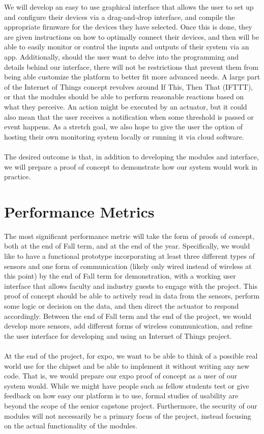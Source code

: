 \documentclass[onecolumn, draftclsnofoot,10pt, compsoc]{IEEEtran}
\begin{document}
    We will develop an easy to use graphical interface that allows the user to set up and configure their devices via a drag-and-drop interface, and compile the appropriate firmware for the devices they have selected. Once this is done, they are given instructions on how to optimally connect their devices, and then will be able to easily monitor or control the inputs and outputs of their system via an app. Additionally, should the user want to delve into the programming and details behind our interface, there will not be restrictions that prevent them from being able customize the platform to better fit more advanced needs. A large part of the Internet of Things concept revolves around If This, Then That (IFTTT), or that the modules should be able to perform reasonable reactions based on what they perceive. An action might be executed by an actuator, but it could also mean that the user receives a notification when some threshold is passed or event happens. As a stretch goal, we also hope to give the user the option of hosting their own monitoring system locally or running it via cloud software.\\ \\
    The desired outcome is that, in addition to developing the modules and interface, we will prepare a proof of concept to demonstrate how our system would work in practice.


\section{Performance Metrics}
    The most significant performance metric will take the form of proofs of concept, both at the end of Fall term, and at the end of the year. Specifically, we would like to have a functional prototype incorporating at least three different types of sensors and one form of communication (likely only wired instead of wireless at this point) by the end of Fall term for demonstration, with a working user interface that allows faculty and industry guests to engage with the project. This proof of concept should be able to actively read in data from the sensors, perform some logic or decision on the data, and then direct the actuator to respond accordingly. Between the end of Fall term and the end of the project, we would develop more sensors, add different forms of wireless communication, and refine the user interface for developing and using an Internet of Things project. \\ \\
    At the end of the project, for expo, we want to be able to think of a possible real world use for the chipset and be able to implement it without writing any new code. That is, we would prepare our expo proof of concept as a user of our system would. While we might have people such as fellow students test or give feedback on how easy our platform is to use, formal studies of usability are beyond the scope of the senior capstone project. Furthermore, the security of our modules will not necessarily be a primary focus of the project, instead focusing on the actual functionality of the modules.
\end{document}
